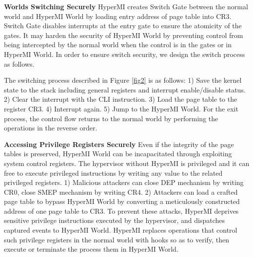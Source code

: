 \documentclass[conference]{IEEEtran}
\begin{document}
\textbf{Worlds Switching Securely}
HyperMI creates Switch Gate between the normal world and HyperMI World by loading entry address of page table into CR3.
Switch Gate disables interrupts at the entry gate to ensure the atomicity of the gates. It may harden the security of HyperMI World by preventing control from being intercepted by the normal world
when the control is in the gates or in HyperMI World. In order to ensure switch security, we design the switch process as follows.

The switching process described in Figure \ref{fig2} is as follows: 1) Save the kernel state to the stack including general registers and interrupt enable/disable status. 2) Clear the interrupt with the CLI instruction. 3) Load the page table to the register CR3. 4) Interrupt again. 5) Jump to the HyperMI World. For the exit process, the control flow returns to the normal world by performing the operations in the reverse order.

\textbf{Accessing Privilege Registers Securely}
Even if the integrity of the page tables is preserved, HyperMI World can be incapacitated through exploiting system control registers.
The hypervisor without HyperMI is privileged and it can free to execute privileged instructions by writing any value to the related privileged registers. 1) Malicious attackers can close DEP mechanism by writing CR0, close SMEP mechanism by writing CR4. 2) Attackers can load a crafted page table to bypass HyperMI World by converting a meticulously constructed address of one page table to CR3.
To prevent these attacks, HyperMI deprives sensitive privilege instructions executed by the hypervisor, and dispatches captured events to HyperMI World. HyperMI replaces operations that control such privilege registers in the normal world with hooks so as to verify, then execute or terminate the process them in HyperMI World.
\end{document}
